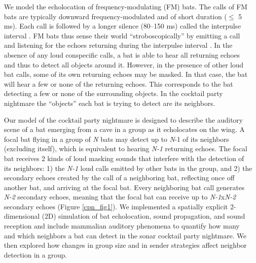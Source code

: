\documentclass[
]{book}
\begin{document}
We model the echolocation of frequency-modulating (FM) bats. The calls of FM bats are typically downward frequency-modulated and of short duration (\(\leq\) 5 ms). Each call is followed by a longer silence (80--150 ms) called the interpulse interval \citep{jones1999a}. FM bats thus sense their world ``stroboscopically'' by emitting a call and listening for the echoes returning during the interpulse interval \citep{griffingalambos1941}. In the absence of any loud conspecific calls, a bat is able to hear all returning echoes and thus to detect all objects around it. However, in the presence of other loud bat calls, some of its own returning echoes may be masked. In that case, the bat will hear a few or none of the returning echoes. This corresponds to the bat detecting a few or none of the surrounding objects. In the cocktail party nightmare the ``objects'' each bat is trying to detect are its neighbors.

Our model of the cocktail party nightmare is designed to describe the auditory scene \citep{ulanovsky2008a} of a bat emerging from a cave in a group as it echolocates on the wing. A focal bat flying in a group of \emph{N} bats may detect up to \emph{N}-1 of its neighbors (excluding itself), which is equivalent to hearing \emph{N-1} returning echoes. The focal bat receives 2 kinds of loud masking sounds that interfere with the detection of its neighbors: 1) the \emph{N-1} loud calls emitted by other bats in the group, and 2) the secondary echoes created by the call of a neighboring bat, reflecting once off another bat, and arriving at the focal bat. Every neighboring bat call generates \emph{N-2} secondary echoes, meaning that the focal bat can receive up to \emph{N-1}x\emph{N-2} secondary echoes (Figure \ref{cpn_fig1}). We implemented a spatially explicit 2-dimensional (2D) simulation of bat echolocation, sound propagation, and sound reception and include mammalian auditory phenomena to quantify how many and which neighbors a bat can detect in the sonar cocktail party nightmare. We then explored how changes in group size and in sender strategies affect neighbor detection in a group.
\end{document}
